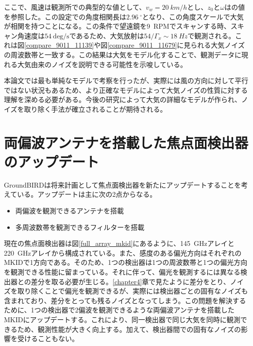 ここで、風速は観測所での典型的な値として、$v_{w}=\SI{20}{km/h}$とし、$z_{0}$と$\omega$は\cite{nishinomiya}の値を参照した。この設定での角度相関長は$\SI{2.96}{^{\circ}}$となり、この角度スケールで大気が相関を持つことになる。この条件で望遠鏡を\SI{9}{RPM}でスキャンする時、スキャン角速度は$\SI{54}{\mathrm{deg/s}}$であるため、大気放射は$54/\Gamma_{x}\sim\SI{18}{Hz}$で観測される。これは図\ref{compare_9011_11139}や図\ref{compare_9011_11679}に見られる大気ノイズの周波数帯と一致する。この結果は大気をモデル化することで、観測データに現れる大気由来のノイズを説明できる可能性を示唆している。

本論文では最も単純なモデルで考察を行ったが、実際には風の方向に対して平行ではない状況もあるため、より正確なモデルによって大気ノイズの性質に対する理解を深める必要がある。今後の研究によって大気の詳細なモデルが作られ、ノイズを取り除く手法が確立されることが期待される。
\section{両偏波アンテナを搭載した焦点面検出器のアップデート}
GroundBIRDは将来計画として焦点面検出器を新たにアップデートすることを考えている。アップデートは主に次の2点からなる。
\begin{itemize}
  \item 両偏波を観測できるアンテナを搭載
  \item 多周波数帯を観測できるフィルターを搭載
\end{itemize}
現在の焦点面検出器は図\ref{full_array_mkid}にあるように、\SI{145}{GHz}アレイと\SI{220}{GHz}アレイから構成されている。また、感度のある偏光方向はそれぞれのMKIDで1方向である。そのため、1つの検出器は1つの周波数帯と1つの偏光方向を観測できる性能に留まっている。それに伴って、偏光を観測するには異なる検出器との差分を取る必要が生じる。\ref{chapter4}章で見たように差分をとり、ノイズを取り除くことで偏光を観測できるが、実際には検出器ごとの固有なノイズも含まれており、差分をとっても残るノイズとなってしまう。この問題を解決するために、1つの検出器で2偏波を観測できるような両偏波アンテナを搭載したMKIDにアップデートする。これにより、同一検出器で同じ大気を同時に観測できるため、観測性能が大きく向上する。加えて、検出器間での固有なノイズの影響を受けることもない。

